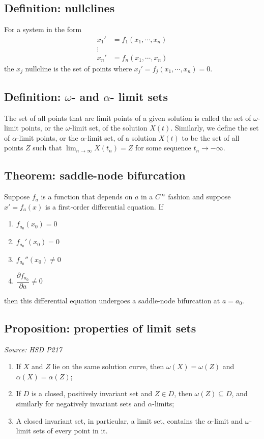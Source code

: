 \documentclass[11pt]{article}
\begin{document}
\subsection{Definition: nullclines}
For a system in the form 
\begin{align*}
    x_1' &= f_1(x_1, \cdots, x_n) \\
    \vdots \\
    x_n' &= f_n(x_1, \cdots, x_n)
\end{align*}
the $x_j$ nullcline is the set of points where $x_j' = f_j(x_1, \cdots, x_n) = 0$. 

\subsection{Definition: $\omega$- and $\alpha$- limit sets}
The set of all points that are limit points of a given solution is called the set of $\omega$-limit points, or the $\omega$-limit set, of the solution $X(t)$. Similarly, we define the set of $\alpha$-limit points, or the $\alpha$-limit set, of a solution $X(t)$ to be the set of all points $Z$ such that $\lim_{n \to \infty} X(t_n)= Z$ for some sequence $t_n \to - \infty$. 

\subsection{Theorem: saddle-node bifurcation} 
Suppose $f_a$ is a function that depends on $a$ in a $C^\infty$ fashion and suppose $x' = f_a(x)$ is a first-order differential equation. If
\begin{enumerate}
    \item $f_{a_0}(x_0) = 0$
    \item $f_{a_0}'(x_0) = 0$
    \item $f_{a_0}''(x_0) \neq 0$
    \item $\dfrac{\partial f_{a_0}}{\partial a} \neq 0$
\end{enumerate}
then this differential equation undergoes a saddle-node bifurcation at $a = a_0$. 

\subsection{Proposition: properties of limit sets}
\emph{Source: HSD P217}
\begin{enumerate}
    \item If $X$ and $Z$ lie on the same solution curve, then $\omega(X) = \omega(Z)$ and $\alpha(X) = \alpha(Z)$; 
    \item If $D$ is a closed, positively invariant set and $Z \in D$, then $\omega(Z) \subseteq D$, and similarly for negatively invariant sets and $\alpha$-limits; 
    \item A closed invariant set, in particular, a limit set, contains the $\alpha$-limit and $\omega$-limit sets of every point in it. 
\end{enumerate}
\end{document}
